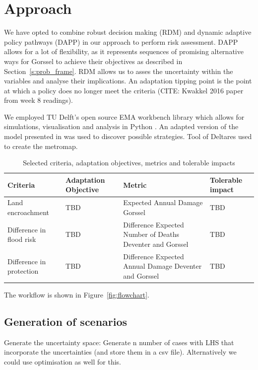 \section{Approach}
\label{s:approach}



We have opted to combine robust decision making (RDM) and dynamic adaptive policy pathways (DAPP) in our approach to perform risk assessment. DAPP allows for a lot of flexibility, as it represents sequences of promising alternative ways for Gorssel to achieve their objectives as described in Section~\ref{s:prob_frame}. RDM allows us to asses the uncertainty within the variables and analyse their implications. An adaptation tipping point is the point at which a policy does no longer meet the criteria (CITE: Kwakkel 2016 paper from week 8 readings).

We employed TU Delft's open source EMA workbench library which allows for simulations, visualisation and analysis in Python \parencite{kwakkel_exploratory_2017}. An adapted version of the model presented in  was used to discover possible strategies. Tool of Deltares used to create the metromap.

\begin{longtable}[c]{p{2cm}p{2cm}p{5cm}l}
\caption{Selected criteria, adaptation objectives, metrics and tolerable impacts}
\label{tab:criteria}\\
\textbf{Criteria}        & \textbf{Adaptation Objective} & \textbf{Metric}                                           & \textbf{Tolerable impact} \\
\hline
\endfirsthead
%
\endhead
%
Land encroachment & TBD & Expected Annual Damage Gorssel & TBD \\
Difference in flood risk & TBD & Difference Expected Number of Deaths Deventer and Gorssel & TBD\\
Difference in protection & TBD & Difference Expected Annual Damage Deventer and Gorssel & TBD
\end{longtable}

The workflow is shown in Figure~\ref{fig:flowchart}.
\subsection{Generation of scenarios}
Generate the uncertainty space: Generate n number of cases with LHS that incorporate the uncertainties (and store them in a csv file). Alternatively we could use optimisation as well for this.

